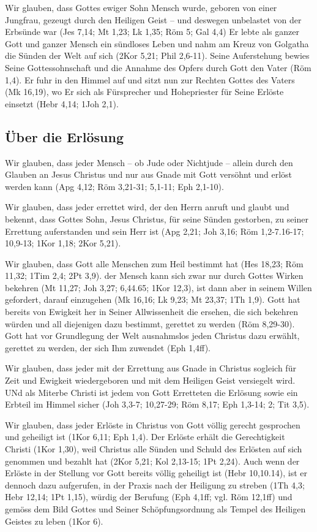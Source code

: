 \documentclass[12pt]{mybib}
\begin{document}
Wir glauben, dass Gottes ewiger Sohn Mensch wurde, geboren von einer Jungfrau, gezeugt durch den Heiligen Geist -- und deswegen unbelastet von der Erbsünde war (Jes 7,14; Mt 1,23; Lk 1,35; Röm 5; Gal 4,4) Er lebte als ganzer Gott und ganzer Mensch ein sündloses Leben und nahm am Kreuz von Golgatha die Sünden der Welt auf sich (2Kor 5,21; Phil 2,6-11). Seine Auferstehung bewies Seine Gottessohnschaft und die Annahme des Opfers durch Gott den Vater (Röm 1,4). Er fuhr in den Himmel auf und sitzt nun zur Rechten Gottes des Vaters (Mk 16,19), wo Er sich als Fürsprecher und Hohepriester für Seine Erlöste einsetzt (Hebr 4,14; 1Joh 2,1).

\subsection{Über die Erlösung}
Wir glauben, dass jeder Mensch -- ob Jude oder Nichtjude -- allein durch den Glauben an Jesus Christus und nur aus Gnade mit Gott versöhnt und erlöst werden kann (Apg 4,12; Röm 3,21-31; 5,1-11; Eph 2,1-10).

Wir glauben, dass jeder errettet wird, der den Herrn anruft und glaubt und bekennt, dass Gottes Sohn, Jesus Christus, für seine Sünden gestorben, zu seiner Errettung auferstanden und sein Herr ist (Apg 2,21; Joh 3,16; Röm 1,2-7.16-17; 10,9-13; 1Kor 1,18; 2Kor 5,21).

Wir glauben, dass Gott alle Menschen zum Heil bestimmt hat (Hes 18,23; Röm 11,32; 1Tim 2,4; 2Pt 3,9). der Mensch kann sich zwar nur durch Gottes Wirken bekehren (Mt 11,27; Joh 3,27; 6,44.65; 1Kor 12,3), ist dann aber in seinem Willen gefordert, darauf einzugehen (Mk 16,16; Lk 9,23; Mt 23,37; 1Th 1,9). Gott hat bereits von Ewigkeit her in Seiner Allwissenheit die ersehen, die sich bekehren würden und all diejenigen dazu bestimmt, gerettet zu werden (Röm 8,29-30). Gott hat vor Grundlegung der Welt ausnahmslos jeden Christus dazu erwählt, gerettet zu werden, der sich Ihm zuwendet (Eph 1,4ff).

Wir glauben, dass jeder mit der Errettung aus Gnade in Christus sogleich für Zeit und Ewigkeit wiedergeboren und mit dem Heiligen Geist versiegelt wird. UNd als Miterbe Christi ist jedem von Gott Erretteten die Erlösung sowie ein Erbteil im Himmel sicher (Joh 3,3-7; 10,27-29; Röm 8,17; Eph 1,3-14; 2; Tit 3,5).

Wir glauben, dass jeder Erlöste in Christus von Gott völlig gerecht gesprochen und geheiligt ist (1Kor 6,11; Eph 1,4). Der Erlöste erhält die Gerechtigkeit Christi (1Kor 1,30), weil Christus alle Sünden und Schuld des Erlösten auf sich genommen und bezahlt hat (2Kor 5,21; Kol 2,13-15; 1Pt 2,24). Auch wenn der Erlöste in der Stellung vor Gott bereits völlig geheiligt ist (Hebr 10,10.14), ist er dennoch dazu aufgerufen, in der Praxis nach der Heiligung zu streben (1Th 4,3; Hebr 12,14; 1Pt 1,15), würdig der Berufung (Eph 4,1ff; vgl. Röm 12,1ff) und gemöss dem Bild Gottes und Seiner Schöpfungsordnung als Tempel des Heiligen Geistes zu leben (1Kor 6).
\end{document}
